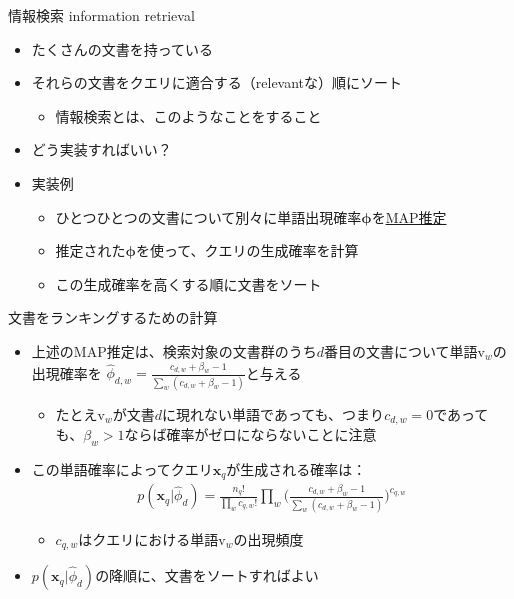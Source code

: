 \documentclass[aspectratio=169,unicode,dvipdfmx,14pt]{beamer}
\begin{document}
\begin{frame}{情報検索 information retrieval}
\begin{itemize}
\item たくさんの文書を持っている
\item それらの文書をクエリに適合する（relevantな）順にソート
\begin{itemize}
\item 情報検索とは、このようなことをすること
\end{itemize}
\item どう実装すればいい？
\item 実装例
\begin{itemize}
\item ひとつひとつの文書について別々に単語出現確率$\bm{\phi}$を\underline{MAP推定}
\item 推定された$\bm{\phi}$を使って、クエリの生成確率を計算
\item この生成確率を高くする順に文書をソート
\end{itemize}
\end{itemize}
\end{frame}

\begin{frame}{文書をランキングするための計算}
\begin{itemize}
\item 上述のMAP推定は、検索対象の文書群のうち$d$番目の文書について単語$\mbox{v}_w$の出現確率を
$\hat{\phi}_{d,w} = \frac{c_{d,w} + \beta_w - 1}{\sum_w (c_{d,w} + \beta_w - 1)}$と与える
\begin{itemize}
\item たとえ$\mbox{v}_w$が文書$d$に現れない単語であっても、つまり$c_{d,w}=0$であっても、$\beta_w > 1$ならば確率がゼロにならないことに注意
\end{itemize}
\item この単語確率によってクエリ$\bm{x}_q$が生成される確率は：
\begin{align}
p(\bm{x}_q | \hat{\phi}_d) = \frac{n_q!}{\prod_w c_{q,w}!}
\prod_w \bigg( \frac{c_{d,w} + \beta_w - 1}{\sum_w (c_{d,w} + \beta_w - 1)} \bigg)^{c_{q,w}}
\end{align}
\begin{itemize}
\item $c_{q,w}$はクエリにおける単語$\mbox{v}_w$の出現頻度
\end{itemize}
\item $p(\bm{x}_q | \hat{\phi}_d)$の降順に、文書をソートすればよい
\end{itemize}
\end{frame}
\end{document}
